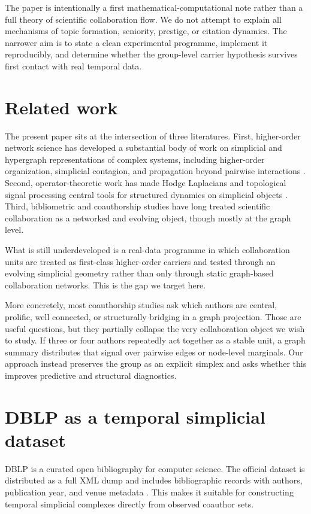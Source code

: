 \documentclass[11pt]{article}
\begin{document}
The paper is intentionally a first mathematical-computational note rather than a full theory of scientific collaboration flow. We do not attempt to explain all mechanisms of topic formation, seniority, prestige, or citation dynamics. The narrower aim is to state a clean experimental programme, implement it reproducibly, and determine whether the group-level carrier hypothesis survives first contact with real temporal data.

\section{Related work}
The present paper sits at the intersection of three literatures. First, higher-order network science has developed a substantial body of work on simplicial and hypergraph representations of complex systems, including higher-order organization, simplicial contagion, and propagation beyond pairwise interactions \cite{BensonGleichLeskovec2016,IacopiniPetriBarratLatora2019,BattistonCencettiIacopiniEtAl2020,BickGrossHarringtonSchaub2023}. Second, operator-theoretic work has made Hodge Laplacians and topological signal processing central tools for structured dynamics on simplicial objects \cite{BarbarossaSardellitti2020,TorresBianconi2020,BacciniGeraciBianconi2022}. Third, bibliometric and coauthorship studies have long treated scientific collaboration as a networked and evolving object, though mostly at the graph level.

What is still underdeveloped is a real-data programme in which collaboration units are treated as first-class higher-order carriers and tested through an evolving simplicial geometry rather than only through static graph-based collaboration networks. This is the gap we target here.

More concretely, most coauthorship studies ask which authors are central, prolific, well connected, or structurally bridging in a graph projection. Those are useful questions, but they partially collapse the very collaboration object we wish to study. If three or four authors repeatedly act together as a stable unit, a graph summary distributes that signal over pairwise edges or node-level marginals. Our approach instead preserves the group as an explicit simplex and asks whether this improves predictive and structural diagnostics.

\section{DBLP as a temporal simplicial dataset}
DBLP is a curated open bibliography for computer science. The official dataset is distributed as a full XML dump and includes bibliographic records with authors, publication year, and venue metadata \cite{DBLPXML}. This makes it suitable for constructing temporal simplicial complexes directly from observed coauthor sets.
\end{document}
